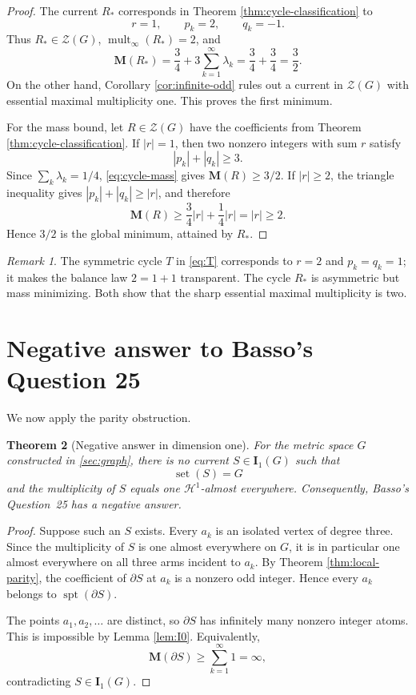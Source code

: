 \documentclass[11pt]{article}
\newtheorem{theorem}{Theorem}[section]
\theoremstyle{remark}
\newtheorem{remark}[theorem]{Remark}
\newcommand{\M}{\mathbf M}
\newcommand{\I}{\mathbf I}
\newcommand{\Hh}{\mathcal H}
\newcommand{\set}{\operatorname{set}}
\newcommand{\spt}{\operatorname{spt}}
\begin{document}
\begin{proof}
The current $R_*$ corresponds in Theorem \ref{thm:cycle-classification} to
\[
       r=1,
       \qquad p_k=2,
       \qquad q_k=-1.
\]
Thus $R_*\in\mathscr Z(G)$, $\operatorname{mult}_{\infty}(R_*)=2$, and
\[
 \M(R_*)=\frac34+3\sum_{k=1}^{\infty}\lambda_k
 =\frac34+\frac34=\frac32.
\]
On the other hand, Corollary \ref{cor:infinite-odd} rules out a current in $\mathscr Z(G)$ with essential maximal multiplicity one. This proves the first minimum.

For the mass bound, let $R\in\mathscr Z(G)$ have the coefficients from Theorem \ref{thm:cycle-classification}. If $|r|=1$, then two nonzero integers with sum $r$ satisfy
\[
       |p_k|+|q_k|\ge3.
\]
Since $\sum_k\lambda_k=1/4$, \eqref{eq:cycle-mass} gives $\M(R)\ge3/2$. If $|r|\ge2$, the triangle inequality gives $|p_k|+|q_k|\ge|r|$, and therefore
\[
       \M(R)\ge
       \frac34|r|+\frac14|r|=|r|\ge2.
\]
Hence $3/2$ is the global minimum, attained by $R_*$.
\end{proof}

\begin{remark}\label{rem:symmetric-minimizing}
The symmetric cycle $T$ in \eqref{eq:T} corresponds to $r=2$ and $p_k=q_k=1$; it makes the balance law $2=1+1$ transparent. The cycle $R_*$ is asymmetric but mass minimizing. Both show that the sharp essential maximal multiplicity is two.
\end{remark}

\section{Negative answer to Basso's Question 25}\label{sec:negative}

We now apply the parity obstruction.

\begin{theorem}[Negative answer in dimension one]\label{thm:negative1}
For the metric space $G$ constructed in \cref{sec:graph}, there is no current $S\in\I_1(G)$ such that
\[
      \set(S)=G
\]
and the multiplicity of $S$ equals one $\Hh^1$-almost everywhere. Consequently, Basso's Question~25 has a negative answer.
\end{theorem}

\begin{proof}
Suppose such an $S$ exists. Every $a_k$ is an isolated vertex of degree three. Since the multiplicity of $S$ is one almost everywhere on $G$, it is in particular one almost everywhere on all three arms incident to $a_k$. By Theorem \ref{thm:local-parity}, the coefficient of $\partial S$ at $a_k$ is a nonzero odd integer. Hence every $a_k$ belongs to $\spt(\partial S)$.

The points $a_1,a_2,\ldots$ are distinct, so $\partial S$ has infinitely many nonzero integer atoms. This is impossible by Lemma \ref{lem:I0}. Equivalently,
\[
       \M(\partial S)\ge\sum_{k=1}^{\infty}1=\infty,
\]
contradicting $S\in\I_1(G)$.
\end{proof}
\end{document}

